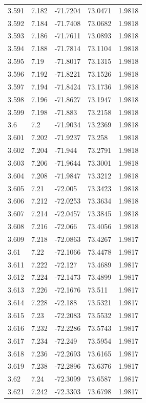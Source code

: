\begin{tabular}{lllll}
3.591 & 7.182 & -71.7204 & 73.0471 & 1.9818 \\
3.592 & 7.184 & -71.7408 & 73.0682 & 1.9818 \\
3.593 & 7.186 & -71.7611 & 73.0893 & 1.9818 \\
3.594 & 7.188 & -71.7814 & 73.1104 & 1.9818 \\
3.595 & 7.19 & -71.8017 & 73.1315 & 1.9818 \\
3.596 & 7.192 & -71.8221 & 73.1526 & 1.9818 \\
3.597 & 7.194 & -71.8424 & 73.1736 & 1.9818 \\
3.598 & 7.196 & -71.8627 & 73.1947 & 1.9818 \\
3.599 & 7.198 & -71.883 & 73.2158 & 1.9818 \\
3.6 & 7.2 & -71.9034 & 73.2369 & 1.9818 \\
3.601 & 7.202 & -71.9237 & 73.258 & 1.9818 \\
3.602 & 7.204 & -71.944 & 73.2791 & 1.9818 \\
3.603 & 7.206 & -71.9644 & 73.3001 & 1.9818 \\
3.604 & 7.208 & -71.9847 & 73.3212 & 1.9818 \\
3.605 & 7.21 & -72.005 & 73.3423 & 1.9818 \\
3.606 & 7.212 & -72.0253 & 73.3634 & 1.9818 \\
3.607 & 7.214 & -72.0457 & 73.3845 & 1.9818 \\
3.608 & 7.216 & -72.066 & 73.4056 & 1.9818 \\
3.609 & 7.218 & -72.0863 & 73.4267 & 1.9817 \\
3.61 & 7.22 & -72.1066 & 73.4478 & 1.9817 \\
3.611 & 7.222 & -72.127 & 73.4689 & 1.9817 \\
3.612 & 7.224 & -72.1473 & 73.4899 & 1.9817 \\
3.613 & 7.226 & -72.1676 & 73.511 & 1.9817 \\
3.614 & 7.228 & -72.188 & 73.5321 & 1.9817 \\
3.615 & 7.23 & -72.2083 & 73.5532 & 1.9817 \\
3.616 & 7.232 & -72.2286 & 73.5743 & 1.9817 \\
3.617 & 7.234 & -72.249 & 73.5954 & 1.9817 \\
3.618 & 7.236 & -72.2693 & 73.6165 & 1.9817 \\
3.619 & 7.238 & -72.2896 & 73.6376 & 1.9817 \\
3.62 & 7.24 & -72.3099 & 73.6587 & 1.9817 \\
3.621 & 7.242 & -72.3303 & 73.6798 & 1.9817 \\

\end{tabular}
